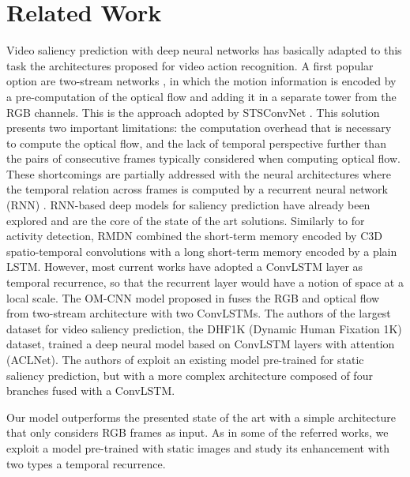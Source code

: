 \documentclass{bmvc2k}
\begin{document}
\section{Related Work}
Video saliency prediction with deep neural networks has basically adapted to this task the architectures proposed for video action recognition.
A first popular option are two-stream networks \cite{simonyan2014two}, in which the motion information is encoded by a pre-computation of the optical flow and adding it in a separate tower from the RGB channels. This is the approach adopted by STSConvNet \cite{bak2017spatio}.
This solution presents two important limitations: the computation overhead that is necessary to compute the optical flow, and the lack of temporal perspective further than the pairs of consecutive frames typically considered when computing optical flow. These shortcomings are partially addressed with the neural architectures where the temporal relation across frames is computed by a recurrent neural network (RNN) \cite{donahue2015long}.
RNN-based deep models for saliency prediction have already been explored \cite{bazzani2016recurrent,jiang2017predicting,Wang2018a,gorji2018going} and are the core of the state of the art solutions.
Similarly to \cite{montes2016temporal} for activity detection, RMDN \cite{bazzani2016recurrent} combined the short-term memory encoded by C3D spatio-temporal convolutions \cite{tran2015learning} with a long short-term memory encoded by a plain LSTM.
However, most current works have adopted a ConvLSTM layer as temporal recurrence, so that the recurrent layer would have a notion of space at a local scale.
The OM-CNN model proposed in \cite{jiang2017predicting} fuses the RGB and optical flow from two-stream architecture with two ConvLSTMs.
The authors of the largest dataset for video saliency prediction, the DHF1K (Dynamic Human Fixation 1K) dataset\cite{Wang2018a}, trained a deep neural model based on ConvLSTM layers with attention (ACLNet). The authors of \cite{gorji2018going} exploit an existing model pre-trained for static saliency prediction, but with a more complex architecture composed of four branches fused with a ConvLSTM.


Our model outperforms the presented state of the art with a simple architecture that only considers RGB frames as input.
As in some of the referred works, we exploit a model pre-trained with static images and study its enhancement with two types a temporal recurrence. 
\end{document}
